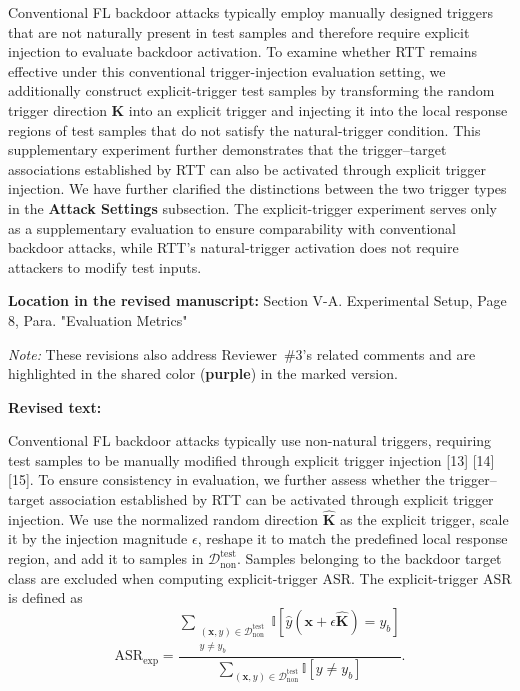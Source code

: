 \documentclass[11pt,a4paper]{article}
\newcommand{\manualindent}{\par\noindent\hspace*{1.5em}\ignorespaces}
\newcommand{\revisedtext}[2]{%
  {\bfseries\color{headingnavy}Location in the revised manuscript:} #1\par
  \begin{tcolorbox}[
      enhanced,breakable,colback=replyblue!3,colframe=replyblue!18,
      before upper={\setlength{\parskip}{6pt}},
      borderline west={2.5pt}{0pt}{replyblue},
      boxrule=0.5pt,arc=1mm,left=11pt,right=9pt,top=8pt,bottom=8pt]
    {\bfseries\color{headingnavy}Revised text:}\par
    #2
  \end{tcolorbox}
  \vspace{0.35em}%
}
\begin{document}
{\manualindent Conventional FL backdoor attacks typically employ manually designed triggers that are not naturally present in test samples and therefore require explicit injection to evaluate backdoor activation.
To examine whether RTT remains effective under this conventional trigger-injection evaluation setting, we additionally construct explicit-trigger test samples by transforming the random trigger direction $\mathbf{K}$ into an explicit trigger and injecting it into the local response regions of test samples that do not satisfy the natural-trigger condition.
This supplementary experiment further demonstrates that the trigger--target associations established by RTT can also be activated through explicit trigger injection.
We have further clarified the distinctions between the two trigger types in the \textbf{Attack Settings} subsection.
The explicit-trigger experiment serves only as a supplementary evaluation to ensure comparability with conventional backdoor attacks, while RTT's natural-trigger activation does not require attackers to modify test inputs.
}

\revisedtext{Section V-A. Experimental Setup, Page 8, Para. "Evaluation Metrics"\par
\noindent \textit{Note:} These revisions also address Reviewer~\#3's related comments and are highlighted in the shared color (\textcolor{share}{\textbf{purple}}) in the marked version.}{\manualindent Conventional FL backdoor attacks typically use non-natural triggers, requiring test samples to be manually modified through explicit trigger injection [13] [14] [15].
To ensure consistency in evaluation, we further assess whether the trigger--target association established by RTT can be activated through explicit trigger injection.
We use the normalized random direction $\hat{\mathbf{K}}$ as the explicit trigger, scale it by the injection magnitude $\epsilon$, reshape it to match the predefined local response region, and add it to samples in $\mathcal{D}_{\mathrm{non}}^{\mathrm{test}}$.
Samples belonging to the backdoor target class are excluded when computing explicit-trigger ASR. The explicit-trigger ASR is defined as
\begin{equation}
\mathrm{ASR}_{\mathrm{exp}}
=
\frac{
\sum_{\substack{
(\mathbf{x},y)\in\mathcal{D}_{\mathrm{non}}^{\mathrm{test}}\\
y\neq y_b
}}
\mathbb{I}[
\hat{y}(\mathbf{x}+\epsilon\hat{\mathbf{K}})=y_b
]
}{
\sum_{(\mathbf{x},y)\in\mathcal{D}_{\mathrm{non}}^{\mathrm{test}}}
\mathbb{I}[y\neq y_b]
}.
\tag{20}
\end{equation}
}
\end{document}
